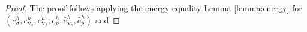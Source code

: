 \documentclass[10pt,letterpaper]{amsart}
\theoremstyle{plain} %
\theoremstyle{remark} %
\newcommand{\vect}[1]{\mathbf{#1}}
\newcommand{\divergence}{\mathrm{div}\,}
\newcommand{\grad}{\mathrm{grad}\,}
\newcommand{\Id}{\mathbb{I}} %
\newcommand{\Ael}{\mathcal{A}} %
\newcommand{\Thprod}[2]{( #1, #2 )_{\mathcal{T}_h}}
\newcommand{\pThprod}[2]{\langle #1, #2 \rangle_{\partial \mathcal{T}_{h}}}
\begin{document}
\begin{proof}
	The proof follows applying the energy equality Lemma \ref{lemma:energy} for $(e_{\sigma}^{h}, e_{\vect{v}_{s}}^h, e_{\vect{v}_{f}}^h, e_{p}^h, \widehat{e}_{\vect{v}_{s}}^{h}, \widehat{e}_{p}^{h})$ and 

\end{proof}
\end{document}
